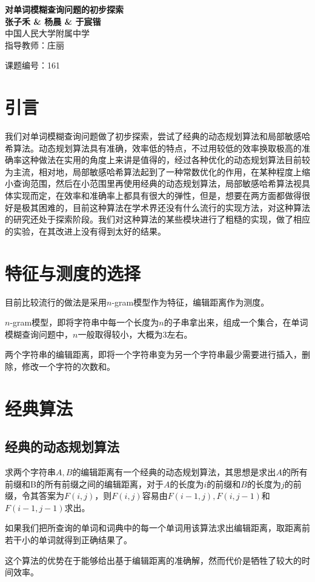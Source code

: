 \documentclass[a0,portrait,20pt]{a0poster}
\begin{document}
 \large
	\begin{minipage}[b]{0.75\linewidth}
		\veryHuge \color{NavyBlue} \textbf{对单词模糊查询问题的初步探索} \color{Black}\\ %
		\huge \textbf{张子禾 \& 杨晨 \& 于宸锴}\\[0.5cm] %
		\huge 中国人民大学附属中学\\[0.4cm] %
		\huge 指导教师：庄丽\\[0.5cm]
	\end{minipage}
	\begin{minipage}[b]{0.25\linewidth}
		\Huge 课题编号：161\\[2cm]
	\end{minipage}
	\vspace{1cm}
	\begin{multicols}{2}
		\color{SaddleBrown}
		\section*{引言}
		我们对单词模糊查询问题做了初步探索，尝试了经典的动态规划算法和局部敏感哈希算法。动态规划算法具有准确，效率低的特点，不过用较低的效率换取极高的准确率这种做法在实用的角度上来讲是值得的，经过各种优化的动态规划算法目前较为主流，相对地，局部敏感哈希算法起到了一种常数优化的作用，在某种程度上缩小查询范围，然后在小范围里再使用经典的动态规划算法，局部敏感哈希算法视具体实现而定，在效率和准确率上都具有很大的弹性，但是，想要在两方面都做得很好是极其困难的，目前这种算法在学术界还没有什么流行的实现方法，对这种算法的研究还处于探索阶段。我们对这种算法的某些模块进行了粗糙的实现，做了相应的实验，在其改进上没有得到太好的结果。
		\color{DarkSlateGray}
		\section{特征与测度的选择}
		目前比较流行的做法是采用$n$-gram模型作为特征，编辑距离作为测度。
		\par $n$-gram模型，即将字符串中每一个长度为$n$的子串拿出来，组成一个集合，在单词模糊查询问题中，$n$一般取得较小，大概为$3$左右。
		\par 两个字符串的编辑距离，即将一个字符串变为另一个字符串最少需要进行插入，删除，修改一个字符的次数和。
		\section{经典算法}
		\subsection*{经典的动态规划算法}
		求两个字符串$A,B$的编辑距离有一个经典的动态规划算法，其思想是求出$A$的所有前缀和B的所有前缀之间的编辑距离，对于$A$的长度为$i$的前缀和$B$的长度为$j$的前缀，令其答案为$F(i,j)$，则$F(i,j)$容易由$F(i-1,j),F(i,j-1)$和$F(i-1,j-1)$求出。
		\par 如果我们把所查询的单词和词典中的每一个单词用该算法求出编辑距离，取距离前若干小的单词就得到正确结果了。
		\par 这个算法的优势在于能够给出基于编辑距离的准确解，然而代价是牺牲了较大的时间效率。

\end{multicols}
\end{document}
